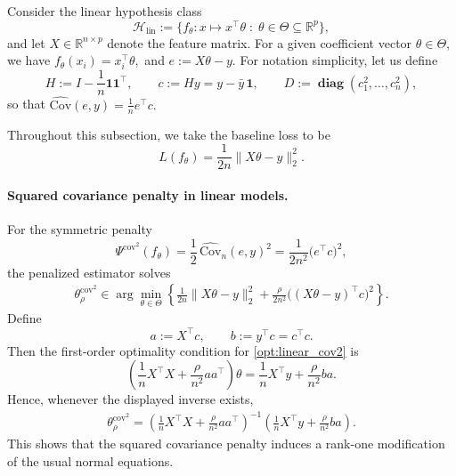 \documentclass[12pt, draft]{article}
\theoremstyle{plain}
\theoremstyle{definition}
\newcommand{\R}{\mathbb{R}}
\newcommand{\1}{\mathbf{1}}
\newcommand{\Cov}{\text{Cov}}
\renewcommand{\H}{\mathcal{H}}
\renewcommand{\R}{\mathbb{R}}
\newcommand{\diag}{\mathbf{\operatorname{diag}}}
\begin{document}
Consider the linear hypothesis class
\[
\H_{\mathrm{lin}} := \{f_\theta : x \mapsto x^\top \theta \;:\; \theta \in \Theta \subseteq \R^p\},
\]
and let $X \in \R^{n\times p}$ denote the feature matrix. For a given coefficient vector $\theta \in \Theta$, we have
$
f_\theta(x_i) = x_i^\top \theta,
$ and $
e := X\theta - y.
$ 
For notation simplicity, let us define
\[
H := I - \frac{1}{n}\mathbf{1}\mathbf{1}^\top,
\qquad
c := Hy = y - \bar y\,\mathbf{1},
\qquad
D := \diag(c_1^2,\dots,c_n^2),
\]
so that
$
\widehat{\Cov}(e,y)
=
\frac{1}{n}e^\top c.
$ 

Throughout this subsection, we take the baseline loss to be
\[
L(f_\theta) = \frac{1}{2n}\|X\theta-y\|_2^2.
\]

\paragraph{Squared covariance penalty in linear models.}
For the symmetric penalty
\[
\Psi^{\mathrm{cov}^2}(f_\theta)
=
\frac{1}{2}\,\widehat{\Cov}_n(e,y)^2
=
\frac{1}{2n^2}\bigl(e^\top c\bigr)^2,
\]
the penalized estimator solves
\begin{align}
    \label{opt:linear_cov2}
    \theta_{\rho}^{\mathrm{cov}^2}
    \in
    \arg\min_{\theta\in\Theta}
    \left\{
        \frac{1}{2n}\|X\theta-y\|_2^2
        +
        \frac{\rho}{2n^2}\bigl((X\theta-y)^\top c\bigr)^2
    \right\}.
\end{align}
Define
\[
a := X^\top c,
\qquad
b := y^\top c = c^\top c.
\]
Then the first-order optimality condition for \eqref{opt:linear_cov2} is
\[
\left(
\frac{1}{n}X^\top X + \frac{\rho}{n^2}aa^\top
\right)\theta
=
\frac{1}{n}X^\top y + \frac{\rho}{n^2}ba.
\]
Hence, whenever the displayed inverse exists,
\begin{align}
    \label{eq:linear_cov2_closed_form}
    \theta_{\rho}^{\mathrm{cov}^2}
    =
    \left(
        \frac{1}{n}X^\top X
        +
        \frac{\rho}{n^2}aa^\top
    \right)^{-1}
    \left(
        \frac{1}{n}X^\top y
        +
        \frac{\rho}{n^2}ba
    \right).
\end{align}
This shows that the squared covariance penalty induces a rank-one modification of the usual normal equations.
\end{document}
